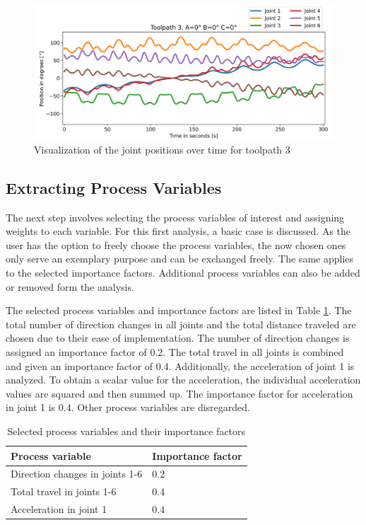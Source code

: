 \begin{figure}[H]
	\centerline{\includegraphics[width=1\textwidth]{figures/TP3ABC0.png}}
	\caption{Visualization of the joint positions over time for toolpath 3}
	\label{TP3ABC0}
\end{figure}

\subsection{Extracting Process Variables}
The next step involves selecting the process variables of interest and assigning weights to each variable. For this first analysis, a basic case is discussed. As the user has the option to freely choose the process variables, the now chosen ones only serve an exemplary purpose and can be exchanged freely. The same applies to the selected importance factors. Additional process variables can also be added or removed form the analysis. 

The selected process variables and importance factors are listed in Table \ref{PPbasic}. The total number of direction changes in all joints and the total distance traveled are chosen due to their ease of implementation. The number of direction changes is assigned an importance factor of 0.2.
The total travel in all joints is combined and given an importance factor of 0.4.
Additionally, the acceleration of joint 1 is analyzed. To obtain a scalar value for the acceleration, the individual acceleration values are squared and then summed up. The importance factor for acceleration in joint 1 is 0.4. Other process variables are disregarded.

\begin{table}[H]
	\centering
	\caption{Selected process variables and their importance factors}
	\begin{tabular}{||l|l||}
		Process variable& Importance factor \\
		\hline
		\hline
		\hline
		Direction changes in joints 1-6	&		0.2 \\
		Total travel in joints 1-6	&  	0.4 \\
		Acceleration in joint 1	& 		0.4\\
		
		\hline
		\hline
	\end{tabular}
	
	
	\label{PPbasic}
\end{table}



